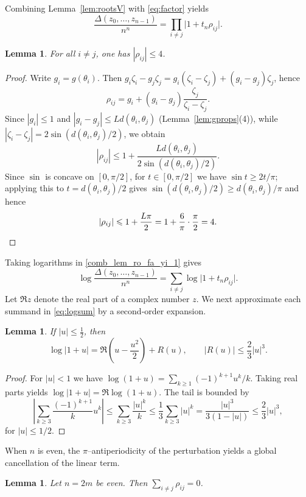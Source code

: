 \documentclass{article}
\newtheorem{lem}[thr]{Lemma}
\theoremstyle{definition}
\let\le\leqslant
\let\ge\geqslant
\begin{document}
Combining Lemma~\ref{lem:rootsV} with \eqref{eq:factor} yields
\begin{equation}\label{comb_lem_ro_fa_yi_1}
\frac{\Delta(z_0,\dots,z_{n-1})}{n^n}
=
\prod_{i\neq j}\bigl|1+t_n\rho_{ij}\bigr|.
\end{equation}

\begin{lem}\label{lem:rhoBound}
For all $i\neq j$, one has $|\rho_{ij}|\le 4$.
\end{lem}

\begin{proof}
Write $g_i=g(\theta_i)$. Then
\(g_i\zeta_i-g_j\zeta_j=g_i(\zeta_i-\zeta_j)+(g_i-g_j)\zeta_j\), hence
\[
\rho_{ij}=g_i+(g_i-g_j)\frac{\zeta_j}{\zeta_i-\zeta_j}.
\]
Since $|g_i|\le 1$ and
$|g_i-g_j|\le Ld(\theta_i,\theta_j)$ (Lemma~\ref{lem:gprops}(4)), while
$|\zeta_i-\zeta_j|=2\sin(d(\theta_i,\theta_j)/2)$, we obtain
\[
|\rho_{ij}|
\le 1+\frac{Ld(\theta_i,\theta_j)}{2\sin(d(\theta_i,\theta_j)/2)}.
\]
Since $\sin$ is concave on $[0,\pi/2]$, for $t\in[0,\pi/2]$ we have
$\sin t\ge 2t/\pi$; applying this to $t=d(\theta_i,\theta_j)/2$ gives
$\sin(d(\theta_i,\theta_j)/2)\ge d(\theta_i,\theta_j)/\pi$ and hence
\[
|\rho_{ij}|\le 1+\frac{L\pi}{2}=1+\frac{6}{\pi}\cdot\frac{\pi}{2}=4.
\qedhere
\]
\end{proof}

Taking logarithms in \eqref{comb_lem_ro_fa_yi_1} gives
\begin{equation}\label{eq:logsum}
\log\frac{\Delta(z_0,\dots,z_{n-1})}{n^n}
=\sum_{i\neq j}\log\bigl|1+t_n\rho_{ij}\bigr|.
\end{equation}
Let \( \Re z \) denote the real part of a complex number $z$. We next approximate each summand in \eqref{eq:logsum} by a second-order expansion.
\begin{lem}\label{lem:taylor}
If $|u|\le \tfrac12$, then
\[
\log|1+u|=\Re \left(u-\frac{u^2}{2}\right)+R(u),
\qquad |R(u)|\le \frac{2}{3}|u|^3.
\]
\end{lem}

\begin{proof}
For $|u|<1$ we have $\log(1+u)=\sum_{k\ge1}(-1)^{k+1}u^k/k$. Taking real parts yields $\log|1+u|=\Re\log(1+u)$. The tail is bounded by
\[
\left|\sum_{k\ge3}\frac{(-1)^{k+1}}{k}u^k\right|
\le \sum_{k\ge3}\frac{|u|^k}{k}
\le \frac{1}{3}\sum_{k\ge3}|u|^k
=\frac{|u|^3}{3(1-|u|)}
\le \frac{2}{3}|u|^3,
\]
for $|u|\le 1/2$.
\end{proof}
When $n$ is even, the $\pi$--antiperiodicity of the perturbation yields a global cancellation of the linear term.
\begin{lem}\label{lem:linearCancel}
Let $n=2m$ be even. Then $\sum_{i\neq j}\rho_{ij}=0$.
\end{lem}
\end{document}
